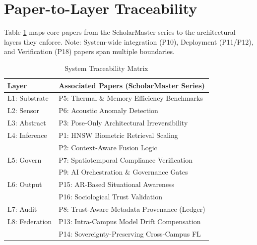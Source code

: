 \documentclass[conference]{IEEEtran}
\begin{document}
\appendices

\section{Paper-to-Layer Traceability}
Table \ref{tab:trace} maps core papers from the ScholarMaster series to the architectural layers they enforce. Note: System-wide integration (P10), Deployment (P11/P12), and Verification (P18) papers span multiple boundaries.

\begin{table}[h]
\caption{System Traceability Matrix}
\centering
\begin{tabular}{p{1.5cm} p{6.5cm}}
\toprule
\textbf{Layer} & \textbf{Associated Papers (ScholarMaster Series)} \\
\midrule
L1: Substrate & P5: Thermal \& Memory Efficiency Benchmarks \\
\midrule
L2: Sensor    & P6: Acoustic Anomaly Detection \\
\midrule
L3: Abstract  & P3: Pose-Only Architectural Irreversibility \\
\midrule
L4: Inference & P1: HNSW Biometric Retrieval Scaling \\
              & P2: Context-Aware Fusion Logic \\
\midrule
L5: Govern    & P7: Spatiotemporal Compliance Verification \\
              & P9: AI Orchestration \& Governance Gates \\
\midrule
L6: Output    & P15: AR-Based Situational Awareness \\
              & P16: Sociological Trust Validation \\
\midrule
L7: Audit     & P8: Trust-Aware Metadata Provenance (Ledger) \\
\midrule
L8: Federation & P13: Intra-Campus Model Drift Compensation \\
               & P14: Sovereignty-Preserving Cross-Campus FL \\
\bottomrule
\end{tabular}
\label{tab:trace}
\end{table}
\end{document}
